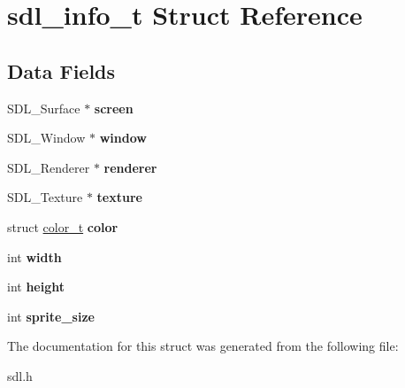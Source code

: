 \hypertarget{structsdl__info__t}{\section{sdl\-\_\-info\-\_\-t Struct Reference}
\label{structsdl__info__t}
}
\subsection*{Data Fields}
\begin{DoxyCompactItemize}
\item 
\hypertarget{structsdl__info__t_a78fa3957d73de49cb81d047857504218}{S\-D\-L\-\_\-\-Surface $\ast$ {\bfseries screen}}\label{structsdl__info__t_a78fa3957d73de49cb81d047857504218}

\item 
\hypertarget{structsdl__info__t_aaa8e409e04dcf575ef63fd5fb3db06f9}{S\-D\-L\-\_\-\-Window $\ast$ {\bfseries window}}\label{structsdl__info__t_aaa8e409e04dcf575ef63fd5fb3db06f9}

\item 
\hypertarget{structsdl__info__t_a966da7a60c4ea3ba301e26ccc5efe452}{S\-D\-L\-\_\-\-Renderer $\ast$ {\bfseries renderer}}\label{structsdl__info__t_a966da7a60c4ea3ba301e26ccc5efe452}

\item 
\hypertarget{structsdl__info__t_a859b8efbf9abe8e82757ee5c75a0c97c}{S\-D\-L\-\_\-\-Texture $\ast$ {\bfseries texture}}\label{structsdl__info__t_a859b8efbf9abe8e82757ee5c75a0c97c}

\item 
\hypertarget{structsdl__info__t_a2c52901ad1424e8161e1238b9df72eae}{struct \hyperlink{structcolor__t}{color\-\_\-t} {\bfseries color}}\label{structsdl__info__t_a2c52901ad1424e8161e1238b9df72eae}

\item 
\hypertarget{structsdl__info__t_a2474a5474cbff19523a51eb1de01cda4}{int {\bfseries width}}\label{structsdl__info__t_a2474a5474cbff19523a51eb1de01cda4}

\item 
\hypertarget{structsdl__info__t_ad12fc34ce789bce6c8a05d8a17138534}{int {\bfseries height}}\label{structsdl__info__t_ad12fc34ce789bce6c8a05d8a17138534}

\item 
\hypertarget{structsdl__info__t_aab4af5e471f473d0a94d8ea7e8e43f06}{int {\bfseries sprite\-\_\-size}}\label{structsdl__info__t_aab4af5e471f473d0a94d8ea7e8e43f06}

\end{DoxyCompactItemize}


The documentation for this struct was generated from the following file\-:\begin{DoxyCompactItemize}
\item 
sdl.\-h\end{DoxyCompactItemize}
